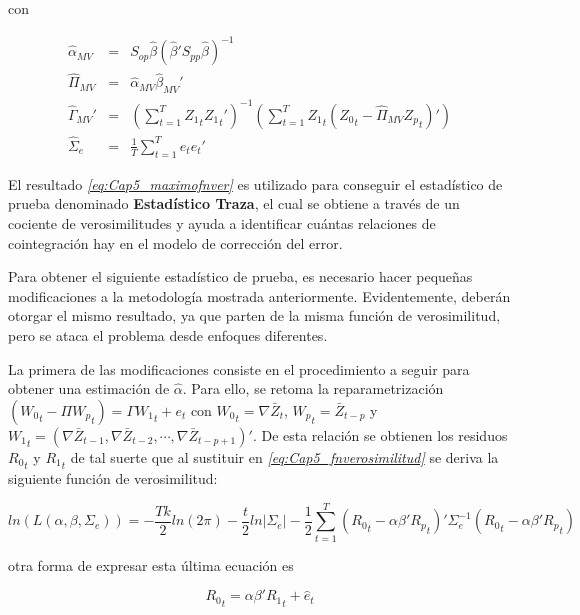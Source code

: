 con 

\begin{eqnarray}
\widehat{\alpha}_{MV} & = & S_{op}\widehat{\beta}(\widehat{\beta}'S_{pp}\widehat{\beta})^{-1} \nonumber \\
\widehat{\Pi}_{MV} &=& \widehat{\alpha}_{MV}\widehat{\beta}_{MV}' \nonumber\\
\widehat{\Gamma}_{MV}' &=& \left ( \sum_{t=1}^T {Z_1}_t{Z_1}_t' \right )^{-1}\left ( \sum_{t=1}^{T}{Z_1}_t\left ( {Z_0}_t-\widehat{\Pi}_{MV}{Z_p}_t \right )' \right ) \nonumber\\
\widehat{\Sigma}_{e} &=& \frac{1}{T}\sum_{t=1}^{T}e_te_t' \nonumber
\end{eqnarray}


El resultado \textit{\ref{eq:Cap5_maximofnver}} es utilizado para conseguir el estadístico de prueba denominado \textbf{Estadístico Traza}, el cual se obtiene a través de un cociente de verosimilitudes y ayuda a identificar cuántas relaciones de cointegración hay en el modelo de corrección del error.\bigskip 

Para obtener el siguiente estadístico de prueba, es necesario hacer pequeñas modificaciones a la metodología mostrada anteriormente. Evidentemente, deberán otorgar el mismo resultado, ya que parten de la misma función de verosimilitud, pero se ataca el problema desde enfoques diferentes.\bigskip 

La primera de las modificaciones consiste en el procedimiento a seguir para obtener una estimación de $\widehat{\alpha}$. Para ello, se retoma la reparametrización  $\left ( {W_0}_t - \Pi {W_p}_t \right ) = \Gamma {W_1}_t +e_t$ con ${W_0}_t= \nabla \bar{Z}_t$, ${W_p}_t=\bar{Z}_{t-p}$ y $ {W_1}_t= ( \nabla \bar{Z}_{t-1}, \nabla \bar{Z}_{t-2},\cdots,\nabla \bar{Z}_{t-p+1})'$. De esta relación se obtienen los residuos ${R_0}_t$ y ${R_1}_t$ de tal suerte que al sustituir en \textit{\ref{eq:Cap5_fnverosimilitud}}  se deriva la siguiente función de verosimilitud:

\begin{equation}\label{fnverosimilitudenfoque2}
ln\left ( L(\alpha,\beta,\Sigma_e) \right )= -\frac{Tk}{2}ln(2\pi)-\frac{t}{2}ln\left | \Sigma_e \right |-\frac{1}{2}\sum_{t=1}^{T}\left ( {R_0}_t- \alpha\beta'{R_p}_t \right )'\Sigma_e^{-1}\left ( {R_0}_t- \alpha\beta'{R_p}_t   \right )
\end{equation}

otra forma de expresar esta última ecuación es 

\begin{equation}
{R_0}_t=\alpha\beta'{R_1}_t + \widehat{e}_t
\end{equation}

